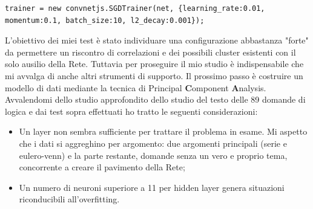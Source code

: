 \begin{itemize}
\begin{verbatim}
trainer = new convnetjs.SGDTrainer(net, {learning_rate:0.01, 
momentum:0.1, batch_size:10, l2_decay:0.001});
\end{verbatim}
\noindent
L'obiettivo dei miei test \`e stato individuare una configurazione abbastanza "forte" da permettere un riscontro di correlazioni e dei possibili cluster esistenti con il solo ausilio della Rete. Tuttavia per proseguire il mio studio \`e indispensabile che mi avvalga di anche altri strumenti di supporto. Il prossimo passo \`e costruire un modello di dati mediante la tecnica di {P}rincipal \textbf{C}omponent \textbf{A}nalysis.
Avvalendomi dello studio approfondito dello studio del testo delle 89 domande di logica e dai test sopra effettuati ho tratto le seguenti considerazioni:
\begin{itemize}
\item Un layer non sembra sufficiente per trattare il problema in esame. Mi aspetto che i dati si aggreghino per argomento:  due argomenti principali (serie e eulero-venn) e la parte restante, domande senza un vero e proprio tema, concorrente a creare il pavimento della Rete;
\item Un numero di neuroni superiore a 11 per hidden layer genera situazioni riconducibili all'overfitting.
\end{itemize}
\end{itemize}

